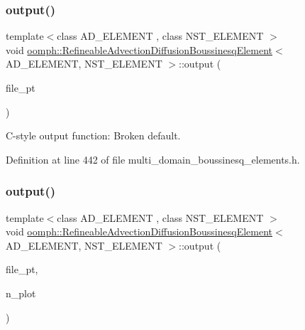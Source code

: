 \subsubsection{\texorpdfstring{output()}{output()}\hspace{0.1cm}{\footnotesize\ttfamily [3/4]}}
{\footnotesize\ttfamily template$<$class A\+D\+\_\+\+E\+L\+E\+M\+E\+NT , class N\+S\+T\+\_\+\+E\+L\+E\+M\+E\+NT $>$ \\
void \hyperlink{classoomph_1_1RefineableAdvectionDiffusionBoussinesqElement}{oomph\+::\+Refineable\+Advection\+Diffusion\+Boussinesq\+Element}$<$ A\+D\+\_\+\+E\+L\+E\+M\+E\+NT, N\+S\+T\+\_\+\+E\+L\+E\+M\+E\+NT $>$\+::output (\begin{DoxyParamCaption}\item[{F\+I\+LE $\ast$}]{file\+\_\+pt }\end{DoxyParamCaption})\hspace{0.3cm}{\ttfamily [inline]}}



C-\/style output function\+: Broken default. 



Definition at line 442 of file multi\+\_\+domain\+\_\+boussinesq\+\_\+elements.\+h.

\mbox{\label{classoomph_1_1RefineableAdvectionDiffusionBoussinesqElement_a61bcd2e4a50f8e157ca40572b384dcee}} 
\subsubsection{\texorpdfstring{output()}{output()}\hspace{0.1cm}{\footnotesize\ttfamily [4/4]}}
{\footnotesize\ttfamily template$<$class A\+D\+\_\+\+E\+L\+E\+M\+E\+NT , class N\+S\+T\+\_\+\+E\+L\+E\+M\+E\+NT $>$ \\
void \hyperlink{classoomph_1_1RefineableAdvectionDiffusionBoussinesqElement}{oomph\+::\+Refineable\+Advection\+Diffusion\+Boussinesq\+Element}$<$ A\+D\+\_\+\+E\+L\+E\+M\+E\+NT, N\+S\+T\+\_\+\+E\+L\+E\+M\+E\+NT $>$\+::output (\begin{DoxyParamCaption}\item[{F\+I\+LE $\ast$}]{file\+\_\+pt,  }\item[{const unsigned \&}]{n\+\_\+plot }\end{DoxyParamCaption})\hspace{0.3cm}{\ttfamily [inline]}}



